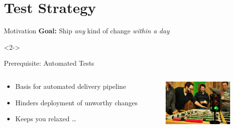 \part{Test Strategy}

\begin{frame}{Motivation}
	\textbf{Goal:} Ship \emph{any} kind of change \emph{within a day}
	\vfill

	\begin{visibleenv}<2->	
	  \begin{block}{Prerequisite: Automated Tests}
	  \begin{columns}
		\begin{column}{0.7\textwidth}
		\begin{itemize}
		  \item Basis for automated delivery pipeline
		  \item Hinders deployment of unworthy changes
		  \item Keeps you relaxed \ldots
		\end{itemize}
		\end{column}
		\begin{column}{0.25\textwidth}
		  \hspace{-7mm}
		  \includegraphics[width=35mm]{../ContinuousDelivery/images/Relaxed_Before_Deployment}\\
		\end{column}
	  \end{columns}
	  \end{block}
	  \end{visibleenv}
	\vfill
	
\end{frame}

